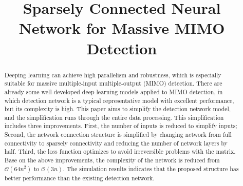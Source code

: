 \documentclass[conference]{IEEEtran}
\begin{document}
\title{Sparsely Connected Neural Network for Massive MIMO Detection}

\author{
}

\maketitle

\begin{abstract}
Deeping learning can achieve high parallelism and robustness, which is especially suitable for massive multiple-input multiple-output (MIMO) detection. There are already some well-developed deep learning models applied to MIMO detection, in which detection network is a typical representative model with excellent performance, but its complexity is high. This paper aims to simplify the detection network model, and the simplification runs through the entire data processing. This simplification includes three improvements. First, the number of inputs is reduced to simplify inputs; Second, the network connection structure is simplified by changing network from full connectivity to sparsely connectivity and reducing the number of network layers by half. Third, the loss function optimizes to avoid irreversible problems with the matrix. Base on the above improvements, the complexity of the network is reduced from ${\mathcal{O}(64n^2)}$ to ${\mathcal{O}(3n)}$. The simulation results indicates that the proposed structure has better performance than the existing detection network.
\end{abstract}

\IEEEpeerreviewmaketitle
\end{document}

